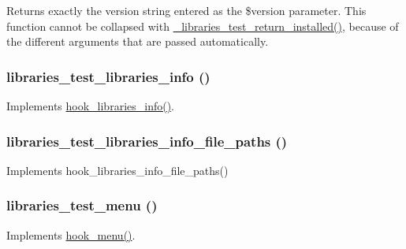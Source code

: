 Returns exactly the version string entered as the \$version parameter. This function cannot be collapsed with \hyperlink{libraries__test_8module_aa90217dd3a963d0d60b2f9c96c80813e}{\_\-libraries\_\-test\_\-return\_\-installed()}, because of the different arguments that are passed automatically. \hypertarget{libraries__test_8module_aa860ec3906a40f89fb93fd16fa00e13e}{
\subsubsection[{libraries\_\-test\_\-libraries\_\-info}]{\setlength{\rightskip}{0pt plus 5cm}libraries\_\-test\_\-libraries\_\-info ()}}
\label{libraries__test_8module_aa860ec3906a40f89fb93fd16fa00e13e}
Implements \hyperlink{libraries_8api_8php_abe57a1a01f1d2d134a9014258fe9e016}{hook\_\-libraries\_\-info()}. \hypertarget{libraries__test_8module_a303e0ac6030ebace3084c766fe0e6d04}{
\subsubsection[{libraries\_\-test\_\-libraries\_\-info\_\-file\_\-paths}]{\setlength{\rightskip}{0pt plus 5cm}libraries\_\-test\_\-libraries\_\-info\_\-file\_\-paths ()}}
\label{libraries__test_8module_a303e0ac6030ebace3084c766fe0e6d04}
Implements hook\_\-libraries\_\-info\_\-file\_\-paths() \hypertarget{libraries__test_8module_a9c8df89dd58a432de148610dcdc2a8d9}{
\subsubsection[{libraries\_\-test\_\-menu}]{\setlength{\rightskip}{0pt plus 5cm}libraries\_\-test\_\-menu ()}}
\label{libraries__test_8module_a9c8df89dd58a432de148610dcdc2a8d9}
Implements \hyperlink{group__hooks_ga5c95244fea59b25666e409759e133ded}{hook\_\-menu()}. 